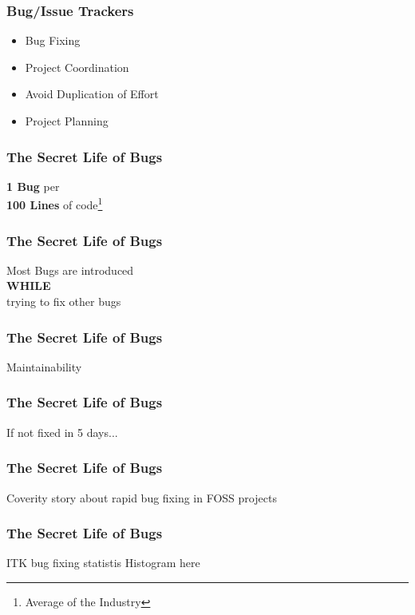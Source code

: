 \documentclass[18pt]{beamer}
\begin{document}
\begin{frame}
\frametitle{Bug/Issue Trackers}
\Huge
\begin{itemize}
\item Bug Fixing
\pause
\item Project Coordination
\pause
\item Avoid Duplication of Effort
\pause
\item Project Planning
\end{itemize}
\end{frame}


\begin{frame}
\frametitle{The Secret Life of Bugs}
\Huge
\begin{center}
\textbf{1 Bug} per\\
\bigskip
\textbf{100 Lines} of code\footnote{Average of the Industry}
\end{center}
\end{frame}


\begin{frame}
\frametitle{The Secret Life of Bugs}
\Huge
Most Bugs are introduced\\
\bigskip
\pause
\textbf{WHILE}\\
\bigskip
trying to fix other bugs
\end{frame}


\begin{frame}
\frametitle{The Secret Life of Bugs}
\Huge
Maintainability
\end{frame}



\begin{frame}
\frametitle{The Secret Life of Bugs}
\Huge
If not fixed in 5 days...
\end{frame}


\begin{frame}
\frametitle{The Secret Life of Bugs}
\Huge
Coverity story about rapid bug fixing in FOSS projects
\end{frame}


\begin{frame}
\frametitle{The Secret Life of Bugs}
\Huge
ITK bug fixing statistis Histogram here
\end{frame}
\end{document}
